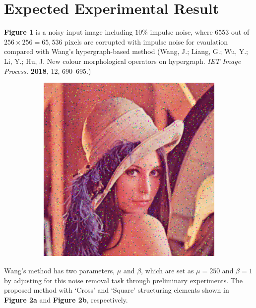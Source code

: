 
\section*{Expected Experimental Result}

\textbf{Figure 1} is a noisy input image including $10\% $ impulse noise, where $6553$ out of $256×256=65,536$ pixels are corrupted with impulse noise for evaulation compared with Wang’s hypergraph-based method (Wang, J.; Liang, G.; Wu, Y.; Li, Y.; Hu, J. New colour morphological operators on hypergraph. \textit{IET Image Process.} \textbf{2018}, 12, 690–695.)
\begin{figure}[H]
    \label{img:figure6}
    \centering
    \begin{subfigure}[t]{.4\textwidth}
    \includegraphics[width=0.9\linewidth]{images/result/figure6.png}
    \centering
    \end{subfigure}
    \caption{}
\end{figure}

Wang’s method has two parameters, $\mu$ and $\beta$, which are set as $\mu = 250$ and $\beta = 1$ by adjusting for this noise removal task through preliminary experiments. The proposed method with ‘Cross’ and ‘Square’ structuring elements shown in \textbf{Figure 2a} and \textbf{Figure 2b}, respectively.

